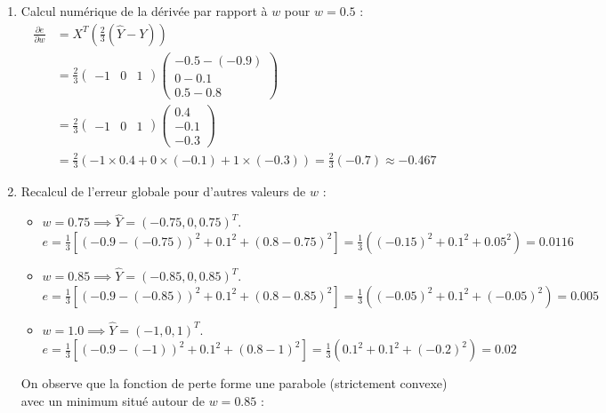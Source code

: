 \documentclass[]{../exercices}
\begin{document}
\begin{solution}
\begin{enumerate}
    \item Calcul numérique de la dérivée par rapport à $w$ pour $w=0.5$ :
    \begin{align*}
        \frac{\partial e}{\partial w} &= X^T \left( \frac{2}{3} (\hat{Y} - Y) \right) \\
        &= \frac{2}{3} \begin{pmatrix} -1 & 0 & 1 \end{pmatrix} \begin{pmatrix} -0.5 - (-0.9) \\ 0 - 0.1 \\ 0.5 - 0.8 \end{pmatrix} \\
        &= \frac{2}{3} \begin{pmatrix} -1 & 0 & 1 \end{pmatrix} \begin{pmatrix} 0.4 \\ -0.1 \\ -0.3 \end{pmatrix} \\
        &= \frac{2}{3} (-1 \times 0.4 + 0 \times (-0.1) + 1 \times (-0.3)) = \frac{2}{3} (-0.7) \approx -0.467
    \end{align*}

    \item Recalcul de l'erreur globale pour d'autres valeurs de $w$ :
    \begin{itemize}
        \item $w = 0.75 \implies \hat{Y} = (-0.75, 0, 0.75)^T$. \\
        $e = \frac{1}{3} \left[ (-0.9 - (-0.75))^2 + 0.1^2 + (0.8 - 0.75)^2 \right] = \frac{1}{3}((-0.15)^2 + 0.1^2 + 0.05^2) = 0.0116$
        \item $w = 0.85 \implies \hat{Y} = (-0.85, 0, 0.85)^T$. \\
        $e = \frac{1}{3} \left[ (-0.9 - (-0.85))^2 + 0.1^2 + (0.8 - 0.85)^2 \right] = \frac{1}{3}((-0.05)^2 + 0.1^2 + (-0.05)^2) = 0.005$
        \item $w = 1.0 \implies \hat{Y} = (-1, 0, 1)^T$. \\
        $e = \frac{1}{3} \left[ (-0.9 - (-1))^2 + 0.1^2 + (0.8 - 1)^2 \right] = \frac{1}{3}(0.1^2 + 0.1^2 + (-0.2)^2) = 0.02$
    \end{itemize}
    On observe que la fonction de perte forme une parabole (strictement convexe) avec un minimum situé autour de $w = 0.85$ :
    \begin{center}
\end{center}
\end{enumerate}
\end{solution}
\end{document}
